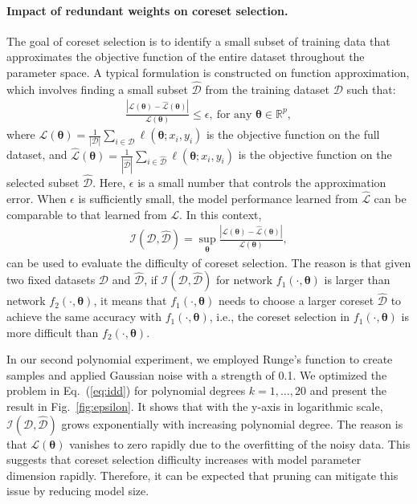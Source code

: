 \paragraph{Impact of redundant weights on coreset selection.}
The goal of coreset selection is to identify a small subset of training data that approximates the objective function of the entire dataset throughout the parameter space. A typical formulation is constructed on function approximation, which involves finding a small subset \( \hat{\mathcal{D}} \) from the training dataset \( \mathcal{D} \) such that:
\begin{align}
   \frac{|\mathcal{L}(\boldsymbol{\theta}) - \hat{\mathcal{L}}(\boldsymbol{\theta})|}{\mathcal{L}(\boldsymbol{\theta})} \leq \epsilon , ~\text{for any } \boldsymbol{\theta} \in \mathbb{R}^p, \label{eq:epsilon}
\end{align}
where \( \mathcal{L}(\boldsymbol{\theta}) = \frac{1}{|\mathcal{D}|} \sum_{i \in \mathcal{D}} \ell(\boldsymbol{\theta}; x_i, y_i) \) is the objective function on the full dataset, and \( \hat{\mathcal{L}}(\boldsymbol{\theta}) = \frac{1}{|\hat{\mathcal{D}}|} \sum_{i \in \hat{\mathcal{D}}} \ell(\boldsymbol{\theta}; x_i, y_i) \) is the objective function on the selected subset \( \hat{\mathcal{D}} \). Here, \( \epsilon \) is a small number that controls the approximation error. When \( \epsilon \) is sufficiently small, the model performance learned from \( \hat{\mathcal{L}} \) can be comparable to that learned from \( \mathcal{L} \). In this context, 
\begin{align}
   \mathcal{I}(\mathcal{D}, \hat{\mathcal{D}}) = \sup_{\boldsymbol{\theta}}\frac{|\mathcal{L}(\boldsymbol{\theta}) - \hat{\mathcal{L}}(\boldsymbol{\theta})|}{\mathcal{L}(\boldsymbol{\theta})}, \label{eq:idd}
\end{align}
can be used to evaluate the difficulty of coreset selection. The reason is that given two fixed datasets $\mathcal{D}$ and $\hat{\mathcal{D}}$, if $\mathcal{I}(\mathcal{D}, \hat{\mathcal{D}}) $ for network $f_1(\cdot, \boldsymbol{\theta})$ is larger than network $f_2(\cdot, \boldsymbol{\theta})$, it means that $f_1(\cdot, \boldsymbol{\theta})$ needs to choose a larger coreset $\hat{\mathcal{D}}$ to achieve the same accuracy with $f_1(\cdot, \boldsymbol{\theta})$, i.e., the coreset selection in $f_1(\cdot, \boldsymbol{\theta})$ is more difficult than $f_2(\cdot, \boldsymbol{\theta})$.

In our second polynomial experiment, we employed Runge's function to create samples and applied Gaussian noise with a strength of 0.1. We optimized the problem in Eq.~(\ref{eq:idd}) for polynomial degrees \( k = 1, \ldots, 20 \) and present the result in Fig.~\ref{fig:epsilon}. It shows that with the y-axis in logarithmic scale, \( \mathcal{I}(\mathcal{D}, \hat{\mathcal{D}}) \) grows exponentially with increasing polynomial degree. The reason is that $\mathcal{L}(\boldsymbol{\theta})$ vanishes to zero rapidly due to the overfitting of the noisy data. 
This suggests that coreset selection difficulty increases with model parameter dimension rapidly. Therefore, it can be expected that pruning can mitigate this issue by reducing model size.

